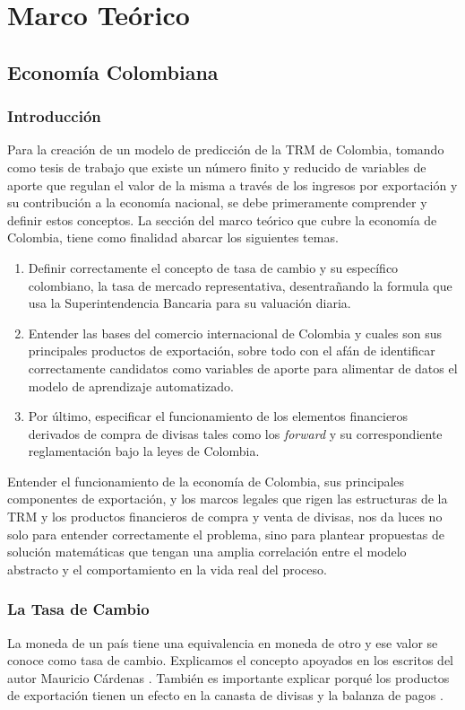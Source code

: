 \documentclass[letterpaper, spanish, 11pt]{report}
\begin{document}
\chapter{Marco Teórico}

\section{Economía Colombiana}

\subsection{Introducción}
Para la creación de un modelo de predicción de la TRM de Colombia, tomando como tesis de trabajo que existe un número finito y reducido de variables de aporte que regulan el valor de la misma a través de los ingresos por exportación y su contribución a la economía nacional, se debe primeramente comprender y definir estos conceptos. La sección del marco teórico que cubre la economía de Colombia, tiene como finalidad abarcar los siguientes temas. 

\begin{enumerate}
	\item Definir correctamente el concepto de tasa de cambio y su específico colombiano, la tasa de mercado representativa, desentrañando la formula que usa la Superintendencia Bancaria para su valuación diaria.
	\item Entender las bases del comercio internacional de Colombia y cuales son sus principales productos de exportación, sobre todo con el afán de identificar correctamente candidatos como variables de aporte para alimentar de datos el modelo de aprendizaje automatizado. 
	\item Por último, especificar el funcionamiento de los elementos financieros derivados de compra de divisas tales como los \emph{forward} y su correspondiente reglamentación bajo la leyes de Colombia. 
\end{enumerate}

Entender el funcionamiento de la economía de Colombia, sus principales componentes de exportación, y los marcos legales que rigen las estructuras de la TRM y los productos financieros de compra y venta de divisas, nos da luces no solo para entender correctamente el problema, sino para plantear propuestas de solución matemáticas que tengan una amplia correlación entre el modelo abstracto y el comportamiento en la vida real del proceso. 
\subsection{La Tasa de Cambio}
La moneda de un país tiene una equivalencia en moneda de otro y ese valor se conoce como tasa de cambio. Explicamos el concepto apoyados en los escritos del autor Mauricio Cárdenas \cite{cardenas}. También es importante explicar porqué los productos de exportación tienen un efecto en la canasta de divisas y la balanza de pagos \cite{crisisCambiarias}.   
\end{document}
